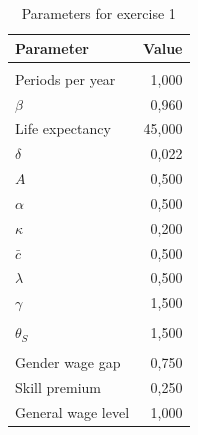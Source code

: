 \documentclass[12pt]{article}
\begin{document}
\begin{table}[htbp]
	\centering
	\caption{Parameters for exercise 1}
	\begin{tabular}{lr}
		\toprule
		Parameter & \multicolumn{1}{l}{Value} \\
		\midrule
		&  \\
		Periods per year & 1,000 \\
		$\beta$ & 0,960 \\
		Life expectancy & 45,000 \\
		$\delta$ & 0,022 \\
		$A$ & 0,500 \\
		$\alpha$ & 0,500 \\
		$\kappa$ & 0,200 \\
		$\bar {c}$ & 0,500 \\
		$\lambda$ & 0,500 \\
		$\gamma$ & 1,500 \\
		&  \\
		$\theta_S$ & 1,500 \\
		&  \\
		Gender wage gap & 0,750 \\
		Skill premium & 0,250 \\
		General wage level & 1,000 \\
		\bottomrule
	\end{tabular}%
\end{table}
\end{document}
